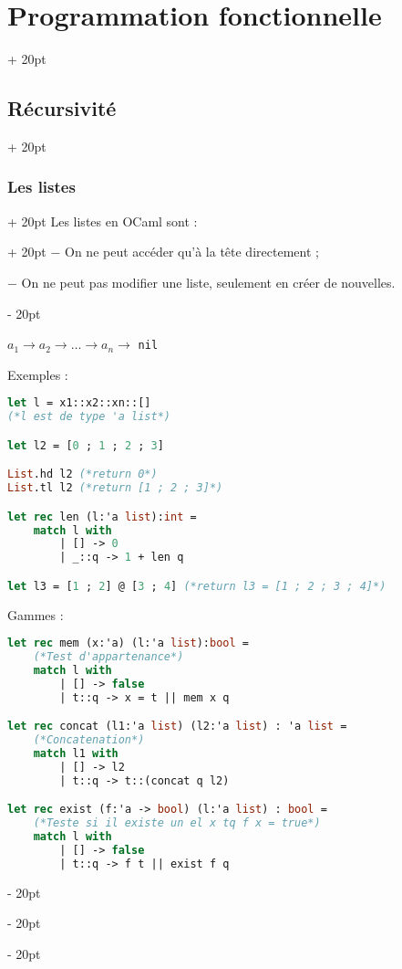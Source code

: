 \documentclass[a4paper, 12pt, twoside]{article}
\newcommand{\ind}[1][20pt]{\advance\leftskip + #1}
\newcommand{\deind}[1][20pt]{\advance\leftskip - #1}
\newenvironment{indentedenv}[1][20pt]{\par \ind[#1]}{\par \deind}
\newenvironment{indt}[2][20pt]{#2 \begin{indentedenv}[#1]}{\end{indentedenv}} %
\begin{document}
\begin{indt}{\section{Programmation fonctionnelle}}
\begin{indt}{\subsection{Récursivité}}
\begin{indt}{\subsubsection{Les listes}}
\begin{indt}{Les listes en OCaml sont :}
                    $-$ On ne peut accéder qu'à la tête directement ;
                    
                    $-$ On ne peut pas modifier une liste, seulement en créer de nouvelles.
                \end{indt}
                
                \vspace{6pt}
                
                $\boxed{a_1} \longrightarrow \boxed{a_2} \longrightarrow \ldots \longrightarrow \boxed{a_n} \longrightarrow$ \texttt{nil}
                
                \vspace{6pt}
                
                Exemples :
                
                \begin{lstlisting}[language=Caml, xleftmargin=80pt]
let l = x1::x2::xn::[]
(*l est de type 'a list*)

let l2 = [0 ; 1 ; 2 ; 3]

List.hd l2 (*return 0*)
List.tl l2 (*return [1 ; 2 ; 3]*)

let rec len (l:'a list):int =
    match l with
        | [] -> 0
        | _::q -> 1 + len q

let l3 = [1 ; 2] @ [3 ; 4] (*return l3 = [1 ; 2 ; 3 ; 4]*)
            \end{lstlisting}
            
            \vspace{6pt}
            
            Gammes :
            
            \begin{lstlisting}[language=Caml, xleftmargin=80pt]
let rec mem (x:'a) (l:'a list):bool =
    (*Test d'appartenance*)
    match l with
        | [] -> false
        | t::q -> x = t || mem x q

let rec concat (l1:'a list) (l2:'a list) : 'a list =
    (*Concatenation*)
    match l1 with
        | [] -> l2
        | t::q -> t::(concat q l2)

let rec exist (f:'a -> bool) (l:'a list) : bool =
    (*Teste si il existe un el x tq f x = true*)
    match l with
        | [] -> false
        | t::q -> f t || exist f q\end{lstlisting}
                
            \end{indt}
            

\end{indt}
\end{indt}
\end{document}
